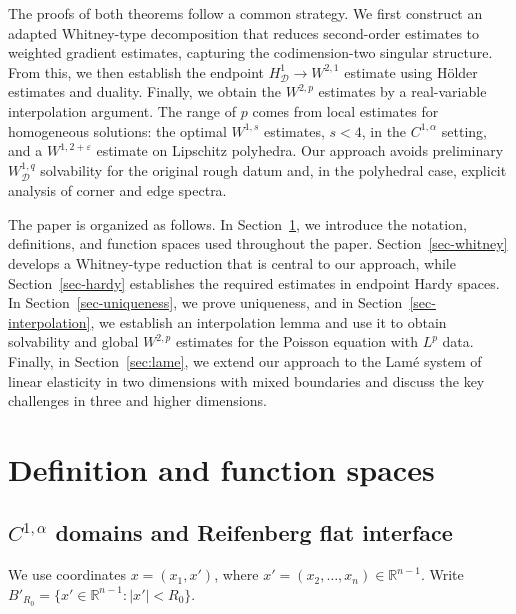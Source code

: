 \documentclass[12pt]{amsart}
\numberwithin{equation}{section}
\newcommand{\bR}{\mathbb{R}}
\newcommand\cD{\mathcal{D}}
\newcommand{\epsi}{\varepsilon}
\begin{document}
\medskip


The proofs of both theorems follow a common strategy. We first construct an adapted Whitney-type decomposition that reduces second-order estimates to weighted gradient estimates, capturing the codimension-two singular structure. From this, we then establish the endpoint $H^1_{\cD}\to W^{2,1}$ estimate using H\"older estimates and duality. Finally, we obtain the $W^{2,p}$ estimates by a real-variable interpolation argument. The range of $p$ comes from local estimates for homogeneous solutions: the optimal $W^{1,s}$ estimates, $s<4$, in the $C^{1,\alpha}$ setting, and a $W^{1,2+\epsi}$ estimate on Lipschitz polyhedra. Our approach avoids preliminary $W^{1,q}_{\cD}$ solvability for the original rough datum and, in the polyhedral case, explicit analysis of corner and edge spectra.


The paper is organized as follows. In Section~\ref{sec-preliminaries}, we introduce the notation, definitions, and function spaces used throughout the paper. Section~\ref{sec-whitney} develops a Whitney-type reduction that is central to our approach, while Section~\ref{sec-hardy} establishes the required estimates in endpoint Hardy spaces. In Section~\ref{sec-uniqueness}, we prove uniqueness, and in Section~\ref{sec-interpolation}, we establish an interpolation lemma and use it to obtain solvability and global $W^{2,p}$ estimates for the Poisson equation with $L^p$ data. Finally, in Section~\ref{sec:lame}, we extend our approach to the Lam\'e system of linear elasticity \cite{MR936420} in two dimensions with mixed boundaries and discuss the key challenges in three and higher dimensions.




\section{Definition and function spaces}
\label{sec-preliminaries}

\subsection{$C^{1,\alpha}$ domains and Reifenberg flat interface}

We use coordinates $x=(x_1,x')$, where
$x'=(x_2,\ldots,x_n)\in\bR^{n-1}$.
Write $B'_{R_0}=\{x'\in\bR^{n-1}:|x'|<R_0\}$.
\end{document}
